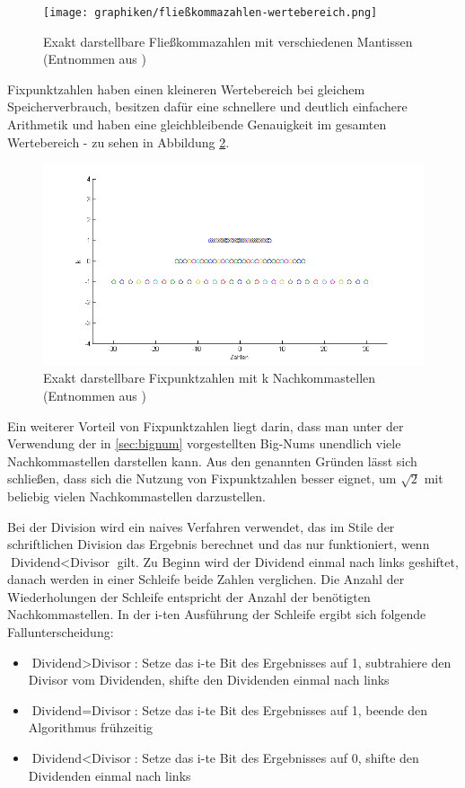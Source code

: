 \documentclass[course=erap]{aspdoc}
\begin{document}
\begin{figure}[h] \centering
  \texttt{[image: graphiken/fließkommazahlen-wertebereich.png]} 
  \caption{Exakt darstellbare Fließkommazahlen mit verschiedenen Mantissen (Entnommen aus \cite{fliesskommazahlen})} \label{img:fließkommazahlen-wertebereich}
\end{figure} 

Fixpunktzahlen haben einen kleineren Wertebereich bei gleichem Speicherverbrauch, besitzen dafür eine schnellere und deutlich einfachere Arithmetik und haben eine gleichbleibende Genauigkeit im gesamten Wertebereich - zu sehen in Abbildung \ref{img:fixpunktzahlen-wertebereich}.

\begin{figure}[h] \centering
  \includegraphics[scale=0.4]{graphiken/fixpunktzahlen-wertebereich.png} 
  \caption{Exakt darstellbare Fixpunktzahlen mit k Nachkommastellen (Entnommen aus \cite{fixpunktzahlen})} \label{img:fixpunktzahlen-wertebereich}
\end{figure} 

Ein weiterer Vorteil von Fixpunktzahlen liegt darin, dass man unter der Verwendung der in \ref{sec:bignum} vorgestellten Big-Nums unendlich viele Nachkommastellen darstellen kann. Aus den
genannten Gründen lässt sich schließen, dass sich die Nutzung von Fixpunktzahlen besser eignet, um $\sqrt{2}$ mit beliebig vielen Nachkommastellen darzustellen. \par

Bei der Division wird ein naives Verfahren verwendet, das im Stile der schriftlichen Division das Ergebnis berechnet und das nur funktioniert, wenn $\text{Dividend} < \text{Divisor}$ gilt. Zu Beginn 
wird der Dividend einmal nach links geshiftet, danach werden in einer Schleife beide Zahlen verglichen. Die Anzahl der Wiederholungen der Schleife entspricht der Anzahl der benötigten Nachkommastellen.
In der i-ten Ausführung der Schleife ergibt sich folgende Fallunterscheidung:
\begin{itemize}
  \item $\text{Dividend} > \text{Divisor}$: Setze das i-te Bit des Ergebnisses auf 1, subtrahiere den Divisor vom Dividenden, shifte den Dividenden einmal nach links
  \item $\text{Dividend} = \text{Divisor}$: Setze das i-te Bit des Ergebnisses auf 1, beende den Algorithmus frühzeitig
  \item $\text{Dividend} < \text{Divisor}$: Setze das i-te Bit des Ergebnisses auf 0, shifte den Dividenden einmal nach links
\end{itemize}
\end{document}
